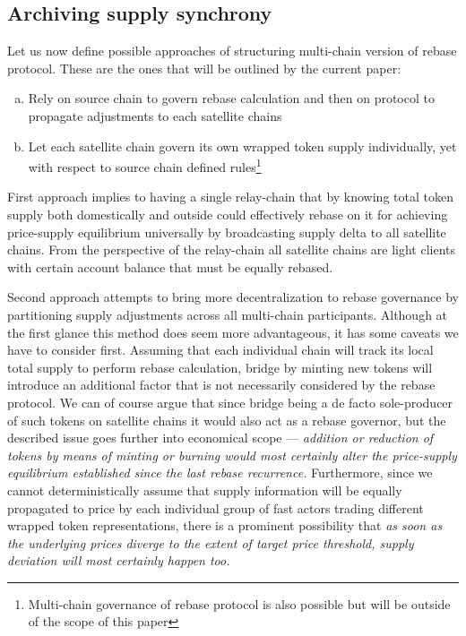 \documentclass{article}
\begin{document}
\subsection{Archiving supply synchrony}

Let us now define possible approaches of structuring multi-chain version of rebase protocol. These are the ones that will be outlined by the current paper:

\begin{enumerate}[a.]
	\item Rely on source chain to govern rebase calculation and then on protocol to propagate adjustments to each satellite chains
	\item Let each satellite chain govern its own wrapped token supply individually, yet with respect to source chain defined rules\footnote{Multi-chain governance of rebase protocol is also possible but will be outside of the scope of this paper}
\end{enumerate}

First approach implies to having a single relay-chain that by knowing total token supply both domestically and outside could effectively rebase on it for achieving price-supply equilibrium universally by broadcasting supply delta to all satellite chains. From the perspective of the relay-chain all satellite chains are light clients with certain account balance that must be equally rebased.

Second approach attempts to bring more decentralization to rebase governance by partitioning supply adjustments across all multi-chain participants. Although at the first glance this method does seem more advantageous, it has some caveats we have to consider first. Assuming that each individual chain will track its local total supply to perform rebase calculation, bridge by minting new tokens will introduce an additional factor that is not necessarily considered by the rebase protocol. We can of course argue that since bridge being a de facto sole-producer of such tokens on satellite chains it would also act as a rebase governor, but the described issue goes further into economical scope --- \textit{addition or reduction of tokens by means of minting or burning would most certainly alter the price-supply equilibrium established since the last rebase recurrence.} Furthermore, since we cannot deterministically assume that supply information will be equally propagated to price by each individual group of fast actors trading different wrapped token representations, there is a prominent possibility that \textit{as soon as the underlying prices diverge to the extent of target price threshold, supply deviation will most certainly happen too.}
\end{document}
